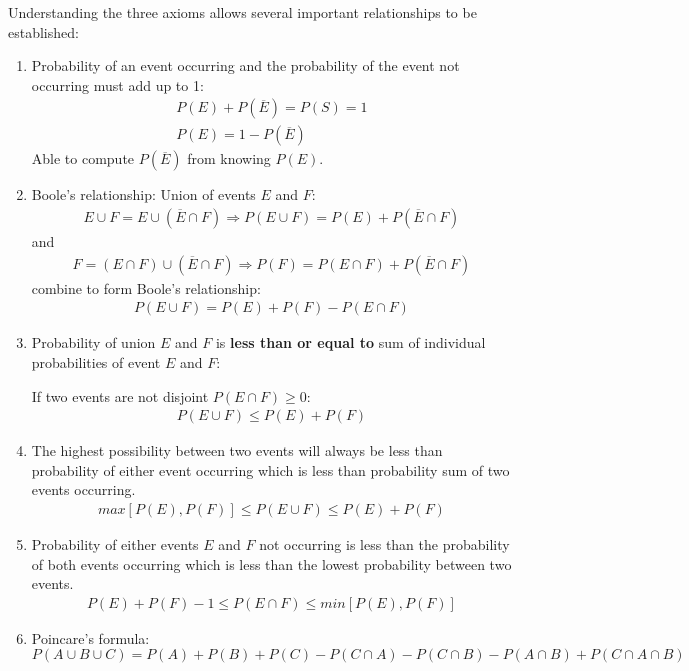 \documentclass[10pt,a4paper]{article}
\begin{document}
Understanding the three axioms allows several important relationships to be established:
\begin{enumerate}
    \item Probability of an event occurring and the probability of the event not
    occurring must add up to 1:
    \begin{align*}
        P(E)+P(\overline{E})=P(S)=1 \\
        P(E) = 1-P(\overline{E})
    \end{align*}
    Able to compute $P(\overline{E})$ from knowing $P(E)$.

    \item Boole's relationship: Union of events $E$ and $F$:
    \begin{align*}
        E \cup F = E\cup \left(\overline{E}\cap F\right) \Rightarrow P(E\cup F) = P(E)+P(\overline{E}\cap F)
    \end{align*}
    and
    \begin{align*}
        F=(E\cap F) \cup (\overline{E}\cap F) \Rightarrow P(F)=P(E\cap F)+P(\overline{E}\cap F)
    \end{align*}
    combine to form Boole's relationship:
    \begin{align*}
        P(E\cup F)=P(E)+P(F)-P(E\cap F)
    \end{align*}
    
    \item Probability of union $E$ and $F$ is \textbf{less than or equal to} sum of individual
    probabilities of event $E$ and $F$:
    
    If two events are not disjoint $P(E \cap F)\geq 0$:
    \begin{align*}
        P(E\cup F) \leq P(E) +P(F)
    \end{align*}

    \item The highest possibility between two events will always be less than probability of either
    event occurring which is less than probability sum of two events occurring.
    \begin{align*}
        max[P(E),P(F)] \leq P(E\cup F) \leq P(E)+P(F)
    \end{align*}

    \item Probability of either events $E$ and $F$ not occurring is less than the probability of
    both events occurring which is less than the lowest probability between two events.
    \begin{align*}
        P(E)+P(F)-1\leq P(E\cap F) \leq min[P(E),P(F)]
    \end{align*}

    \item Poincare's formula:
    $$
        P(A\cup B \cup C)=P(A)+P(B)+P(C)-P(C\cap A)-P(C\cap B)-P(A\cap B)+P(C\cap A\cap B)
    $$
\end{enumerate}
\end{document}
